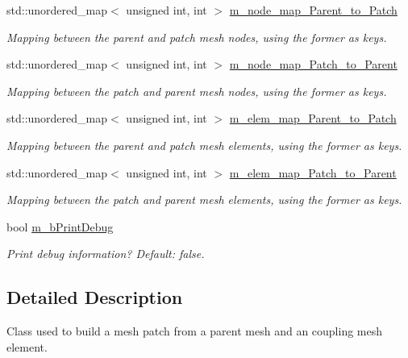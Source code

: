 \begin{DoxyCompactItemize}
std\+::unordered\+\_\+map$<$ unsigned int, int $>$ \hyperlink{classcarl_1_1_patch__construction_aace17a766982c2c00b603561f3df9814}{m\+\_\+node\+\_\+map\+\_\+\+Parent\+\_\+to\+\_\+\+Patch}
\begin{DoxyCompactList}\small\item\em Mapping between the parent and patch mesh nodes, using the former as keys. \end{DoxyCompactList}\item 
std\+::unordered\+\_\+map$<$ unsigned int, int $>$ \hyperlink{classcarl_1_1_patch__construction_a8a53700b4debd54f12cd42d62f991e5a}{m\+\_\+node\+\_\+map\+\_\+\+Patch\+\_\+to\+\_\+\+Parent}
\begin{DoxyCompactList}\small\item\em Mapping between the patch and parent mesh nodes, using the former as keys. \end{DoxyCompactList}\item 
std\+::unordered\+\_\+map$<$ unsigned int, int $>$ \hyperlink{classcarl_1_1_patch__construction_a2552a3745b426adbd06864ade93b9973}{m\+\_\+elem\+\_\+map\+\_\+\+Parent\+\_\+to\+\_\+\+Patch}
\begin{DoxyCompactList}\small\item\em Mapping between the parent and patch mesh elements, using the former as keys. \end{DoxyCompactList}\item 
std\+::unordered\+\_\+map$<$ unsigned int, int $>$ \hyperlink{classcarl_1_1_patch__construction_a801e75fa9573645a57d24b996611fe4d}{m\+\_\+elem\+\_\+map\+\_\+\+Patch\+\_\+to\+\_\+\+Parent}
\begin{DoxyCompactList}\small\item\em Mapping between the patch and parent mesh elements, using the former as keys. \end{DoxyCompactList}\item 
bool \hyperlink{classcarl_1_1_patch__construction_a93158e5a81432eb8f92860552bff37bc}{m\+\_\+b\+Print\+Debug}
\begin{DoxyCompactList}\small\item\em Print debug information? {\itshape Default\+:} false. \end{DoxyCompactList}\end{DoxyCompactItemize}


\subsection{Detailed Description}
Class used to build a mesh patch from a parent mesh and an coupling mesh element. 

